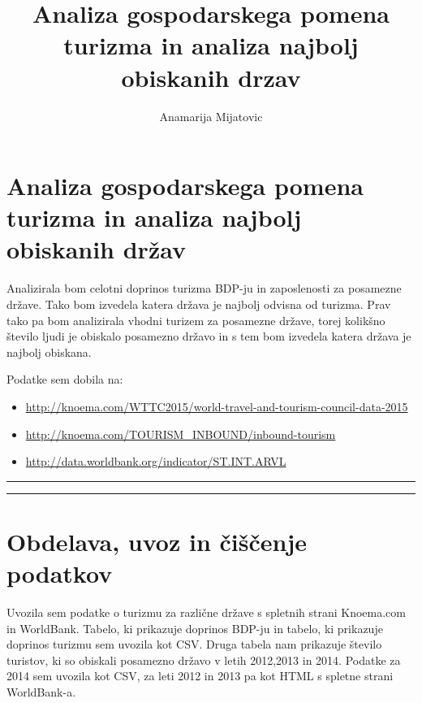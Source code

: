 \documentclass[]{article}
\title{Analiza gospodarskega pomena turizma in analiza najbolj obiskanih drzav}
\author{Anamarija Mijatovic}
\date{}
\begin{document}
\maketitle


\section{Analiza gospodarskega pomena turizma in analiza najbolj
obiskanih
držav}\label{analiza-gospodarskega-pomena-turizma-in-analiza-najbolj-obiskanih-drzav}

Analizirala bom celotni doprinos turizma BDP-ju in zaposlenosti za
posamezne države. Tako bom izvedela katera država je najbolj odvisna od
turizma. Prav tako pa bom analizirala vhodni turizem za posamezne
države, torej kolikšno število ljudi je obiskalo posamezno državo in s
tem bom izvedela katera država je najbolj obiskana.

Podatke sem dobila na:

\begin{itemize}
\itemsep1pt\parskip0pt
\item
  \url{http://knoema.com/WTTC2015/world-travel-and-tourism-council-data-2015}
\item
  \url{http://knoema.com/TOURISM_INBOUND/inbound-tourism}
\item
  \url{http://data.worldbank.org/indicator/ST.INT.ARVL}
\end{itemize}

\begin{center}\rule{0.5\linewidth}{\linethickness}\end{center}

\begin{center}\rule{0.5\linewidth}{\linethickness}\end{center}

\section{Obdelava, uvoz in čiščenje
podatkov}\label{obdelava-uvoz-in-ciscenje-podatkov}

Uvozila sem podatke o turizmu za različne države s spletnih strani
Knoema.com in WorldBank. Tabelo, ki prikazuje doprinos BDP-ju in tabelo,
ki prikazuje doprinos turizmu sem uvozila kot CSV. Druga tabela nam
prikazuje število turistov, ki so obiskali posamezno državo v letih
2012,2013 in 2014. Podatke za 2014 sem uvozila kot CSV, za leti 2012 in
2013 pa kot HTML s spletne strani WorldBank-a.
\end{document}
